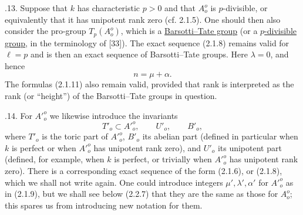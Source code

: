 \medskip
{}.13. Suppose that $k$ has characteristic $p>0$ and that $A_o^o$ is
$p$-divisible, or equivalently that it has unipotent rank zero
(cf. 2.1.5).  One should then also consider the pro-group $T_p(A_o^o)$,
which is a \underline{Barsotti--Tate group} (or a
\underline{$p$-divisible group}, in the terminology of [33]).  The
exact sequence (2.1.8) remains valid for $\ell=p$ and is then an exact
sequence of Barsotti--Tate groups.  Here $\lambda=0$, and hence
\begin{equation}\tag{2.1.13.1}
 n=\mu+\alpha.
\end{equation}
The formulas (2.1.11) also remain valid, provided that rank is
interpreted as the rank (or ``height'') of the Barsotti--Tate groups in
question.

\medskip
{}.14. For ${A'}_o^o$ we likewise introduce the invariants
\[
 T'_o\subset {A'}_o^o,\qquad U'_o,\qquad B'_o,
\]
where $T'_o$ is the toric part of ${A'}_o^o$, $B'_o$ its abelian part
(defined in particular when $k$ is perfect or when ${A'}_o^o$ has
unipotent rank zero), and $U'_o$ its unipotent part (defined, for
example, when $k$ is perfect, or trivially when ${A'}_o^o$ has
unipotent rank zero).  There is a corresponding exact sequence of the
form (2.1.6), or (2.1.8), which we shall not write again.  One could
introduce integers $\mu',\lambda',\alpha'$ for ${A'}_o^o$ as in
(2.1.9), but we shall see below (2.2.7) that they are the same as those
for $A_o^o$; this spares us from introducing new notation for them.
